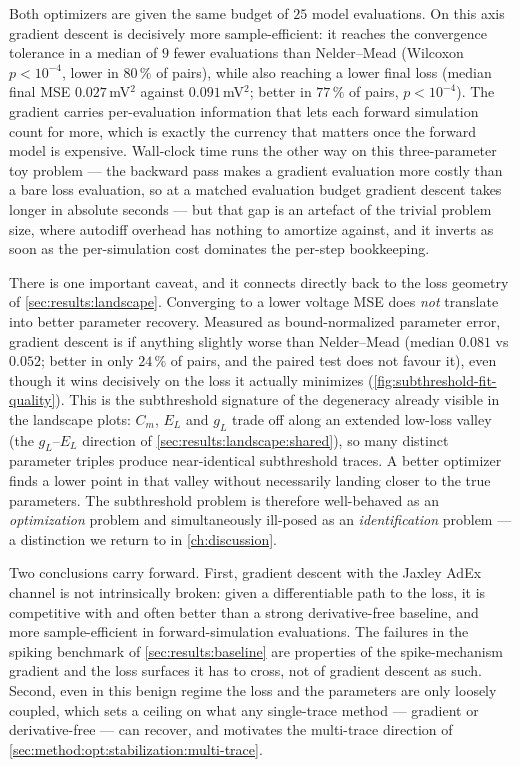 Both optimizers are given the same budget of $25$ model evaluations.
On this axis gradient descent is decisively more sample-efficient: it reaches the convergence tolerance in a median of $9$ fewer evaluations than Nelder--Mead (Wilcoxon $p < 10^{-4}$, lower in $80\,\%$ of pairs), while also reaching a lower final loss (median final \gls{MSE} $0.027$\,mV$^2$ against $0.091$\,mV$^2$; better in $77\,\%$ of pairs, $p < 10^{-4}$).
The gradient carries per-evaluation information that lets each forward simulation count for more, which is exactly the currency that matters once the forward model is expensive.
Wall-clock time runs the other way on this three-parameter toy problem ---
the backward pass makes a gradient evaluation more costly than a bare loss evaluation, so at a matched evaluation budget gradient descent takes longer in absolute seconds ---
but that gap is an artefact of the trivial problem size, where autodiff overhead has nothing to amortize against, and it inverts as soon as the per-simulation cost dominates the per-step bookkeeping.

There is one important caveat, and it connects directly back to the loss geometry of \cref{sec:results:landscape}.
Converging to a lower voltage \gls{MSE} does \emph{not} translate into better parameter recovery.
Measured as bound-normalized parameter error, gradient descent is if anything slightly worse than Nelder--Mead (median $0.081$ vs $0.052$; better in only $24\,\%$ of pairs, and the paired test does not favour it), even though it wins decisively on the loss it actually minimizes (\cref{fig:subthreshold-fit-quality}).
This is the subthreshold signature of the degeneracy already visible in the landscape plots: $C_m$, $E_L$ and $g_L$ trade off along an extended low-loss valley (the $g_L$--$E_L$ direction of \cref{sec:results:landscape:shared}), so many distinct parameter triples produce near-identical subthreshold traces.
A better optimizer finds a lower point in that valley without necessarily landing closer to the true parameters.
The subthreshold problem is therefore well-behaved as an \emph{optimization} problem and simultaneously ill-posed as an \emph{identification} problem --- a distinction we return to in \cref{ch:discussion}.

Two conclusions carry forward.
First, gradient descent with the Jaxley \gls{AdEx} channel is not intrinsically broken: given a differentiable path to the loss, it is competitive with and often better than a strong derivative-free baseline, and more sample-efficient in forward-simulation evaluations.
The failures in the spiking benchmark of \cref{sec:results:baseline} are properties of the spike-mechanism gradient and the loss surfaces it has to cross, not of gradient descent as such.
Second, even in this benign regime the loss and the parameters are only loosely coupled, which sets a ceiling on what any single-trace method --- gradient or derivative-free --- can recover, and motivates the multi-trace direction of \cref{sec:method:opt:stabilization:multi-trace}.
